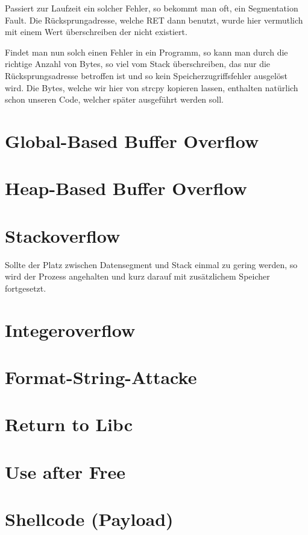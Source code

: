 \documentclass[12pt]{book}
\begin{document}
Passiert zur Laufzeit ein solcher Fehler, so bekommt man oft, ein Segmentation
Fault. Die Rücksprungadresse, welche RET dann benutzt, wurde hier vermutlich mit
einem Wert überschreiben der nicht existiert.

Findet man nun solch einen Fehler in ein Programm, so kann man durch die
richtige Anzahl von Bytes, so viel vom Stack überschreiben, das nur die
Rücksprungsadresse betroffen ist und so kein Speicherzugriffsfehler ausgelöst
wird. Die Bytes, welche wir hier von strcpy kopieren lassen, enthalten natürlich
schon unseren Code, welcher später ausgeführt werden soll.

\section{Global-Based Buffer Overflow}

\section{Heap-Based Buffer Overflow}

\section{Stackoverflow}
Sollte der Platz zwischen Datensegment und Stack einmal zu gering werden, so
wird der Prozess angehalten und kurz darauf mit zusätzlichem Speicher
fortgesetzt.

\section{Integeroverflow}

\section{Format-String-Attacke}

\section{Return to Libc}

\section{Use after Free}

\section{Shellcode (Payload)}
\end{document}

